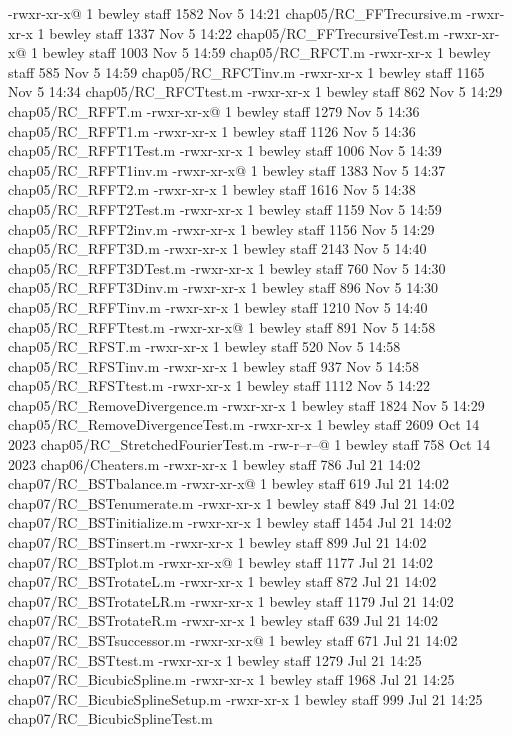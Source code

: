 -rwxr-xr-x@ 1 bewley  staff   1582 Nov  5 14:21 chap05/RC_FFTrecursive.m
-rwxr-xr-x  1 bewley  staff   1337 Nov  5 14:22 chap05/RC_FFTrecursiveTest.m
-rwxr-xr-x@ 1 bewley  staff   1003 Nov  5 14:59 chap05/RC_RFCT.m
-rwxr-xr-x  1 bewley  staff    585 Nov  5 14:59 chap05/RC_RFCTinv.m
-rwxr-xr-x  1 bewley  staff   1165 Nov  5 14:34 chap05/RC_RFCTtest.m
-rwxr-xr-x  1 bewley  staff    862 Nov  5 14:29 chap05/RC_RFFT.m
-rwxr-xr-x@ 1 bewley  staff   1279 Nov  5 14:36 chap05/RC_RFFT1.m
-rwxr-xr-x  1 bewley  staff   1126 Nov  5 14:36 chap05/RC_RFFT1Test.m
-rwxr-xr-x  1 bewley  staff   1006 Nov  5 14:39 chap05/RC_RFFT1inv.m
-rwxr-xr-x@ 1 bewley  staff   1383 Nov  5 14:37 chap05/RC_RFFT2.m
-rwxr-xr-x  1 bewley  staff   1616 Nov  5 14:38 chap05/RC_RFFT2Test.m
-rwxr-xr-x  1 bewley  staff   1159 Nov  5 14:59 chap05/RC_RFFT2inv.m
-rwxr-xr-x  1 bewley  staff   1156 Nov  5 14:29 chap05/RC_RFFT3D.m
-rwxr-xr-x  1 bewley  staff   2143 Nov  5 14:40 chap05/RC_RFFT3DTest.m
-rwxr-xr-x  1 bewley  staff    760 Nov  5 14:30 chap05/RC_RFFT3Dinv.m
-rwxr-xr-x  1 bewley  staff    896 Nov  5 14:30 chap05/RC_RFFTinv.m
-rwxr-xr-x  1 bewley  staff   1210 Nov  5 14:40 chap05/RC_RFFTtest.m
-rwxr-xr-x@ 1 bewley  staff    891 Nov  5 14:58 chap05/RC_RFST.m
-rwxr-xr-x  1 bewley  staff    520 Nov  5 14:58 chap05/RC_RFSTinv.m
-rwxr-xr-x  1 bewley  staff    937 Nov  5 14:58 chap05/RC_RFSTtest.m
-rwxr-xr-x  1 bewley  staff   1112 Nov  5 14:22 chap05/RC_RemoveDivergence.m
-rwxr-xr-x  1 bewley  staff   1824 Nov  5 14:29 chap05/RC_RemoveDivergenceTest.m
-rwxr-xr-x  1 bewley  staff   2609 Oct 14  2023 chap05/RC_StretchedFourierTest.m
-rw-r--r--@ 1 bewley  staff    758 Oct 14  2023 chap06/Cheaters.m
-rwxr-xr-x  1 bewley  staff    786 Jul 21 14:02 chap07/RC_BSTbalance.m
-rwxr-xr-x@ 1 bewley  staff    619 Jul 21 14:02 chap07/RC_BSTenumerate.m
-rwxr-xr-x  1 bewley  staff    849 Jul 21 14:02 chap07/RC_BSTinitialize.m
-rwxr-xr-x  1 bewley  staff   1454 Jul 21 14:02 chap07/RC_BSTinsert.m
-rwxr-xr-x  1 bewley  staff    899 Jul 21 14:02 chap07/RC_BSTplot.m
-rwxr-xr-x@ 1 bewley  staff   1177 Jul 21 14:02 chap07/RC_BSTrotateL.m
-rwxr-xr-x  1 bewley  staff    872 Jul 21 14:02 chap07/RC_BSTrotateLR.m
-rwxr-xr-x  1 bewley  staff   1179 Jul 21 14:02 chap07/RC_BSTrotateR.m
-rwxr-xr-x  1 bewley  staff    639 Jul 21 14:02 chap07/RC_BSTsuccessor.m
-rwxr-xr-x@ 1 bewley  staff    671 Jul 21 14:02 chap07/RC_BSTtest.m
-rwxr-xr-x  1 bewley  staff   1279 Jul 21 14:25 chap07/RC_BicubicSpline.m
-rwxr-xr-x  1 bewley  staff   1968 Jul 21 14:25 chap07/RC_BicubicSplineSetup.m
-rwxr-xr-x  1 bewley  staff    999 Jul 21 14:25 chap07/RC_BicubicSplineTest.m
